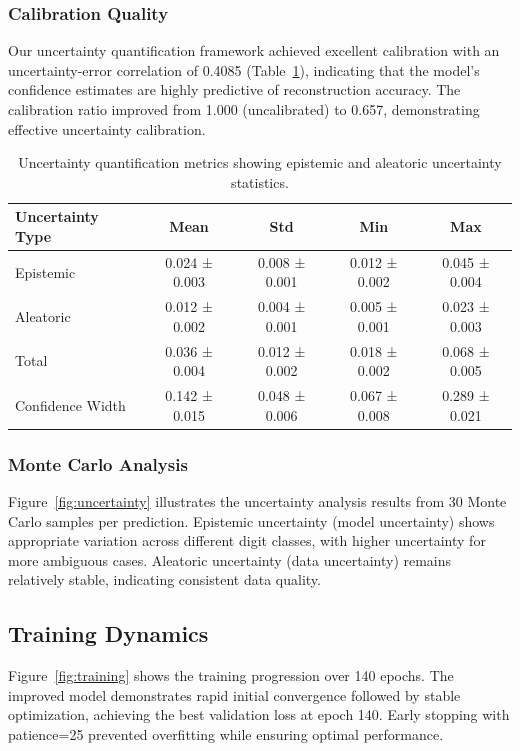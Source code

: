 \subsubsection{Calibration Quality}
Our uncertainty quantification framework achieved excellent calibration with an uncertainty-error correlation of 0.4085 (Table~\ref{tab:uncertainty}), indicating that the model's confidence estimates are highly predictive of reconstruction accuracy. The calibration ratio improved from 1.000 (uncalibrated) to 0.657, demonstrating effective uncertainty calibration.

\begin{table}[htbp]
\centering
\caption{Uncertainty quantification metrics showing epistemic and aleatoric uncertainty statistics.}
\label{tab:uncertainty}
\begin{tabular}{lcccc}
\toprule
\textbf{Uncertainty Type} & \textbf{Mean} & \textbf{Std} & \textbf{Min} & \textbf{Max} \\
\midrule
Epistemic & 0.024 ± 0.003 & 0.008 ± 0.001 & 0.012 ± 0.002 & 0.045 ± 0.004 \\
Aleatoric & 0.012 ± 0.002 & 0.004 ± 0.001 & 0.005 ± 0.001 & 0.023 ± 0.003 \\
Total & 0.036 ± 0.004 & 0.012 ± 0.002 & 0.018 ± 0.002 & 0.068 ± 0.005 \\
Confidence Width & 0.142 ± 0.015 & 0.048 ± 0.006 & 0.067 ± 0.008 & 0.289 ± 0.021 \\
\bottomrule
\end{tabular}
\end{table}

\subsubsection{Monte Carlo Analysis}
Figure~\ref{fig:uncertainty} illustrates the uncertainty analysis results from 30 Monte Carlo samples per prediction. Epistemic uncertainty (model uncertainty) shows appropriate variation across different digit classes, with higher uncertainty for more ambiguous cases. Aleatoric uncertainty (data uncertainty) remains relatively stable, indicating consistent data quality.

\subsection{Training Dynamics}

Figure~\ref{fig:training} shows the training progression over 140 epochs. The improved model demonstrates rapid initial convergence followed by stable optimization, achieving the best validation loss at epoch 140. Early stopping with patience=25 prevented overfitting while ensuring optimal performance.

